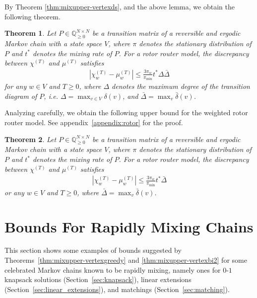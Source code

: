 \documentclass[letter, 11pt]{article}
\newcommand{\1}{\mbox{1}\hspace{-0.25em}\mbox{l}}
\newtheorem{theorem}{Theorem}[section]
\begin{document}
 By Theorem \ref{thm:mixupper-vertexds}, and the above lemma, 
  we obtain the following theorem. 
\begin{theorem}
\label{thm:mixupper-vertexrr}
 Let $P \in \mathbb{Q}_{\geq 0}^{N \times N}$ be a transition matrix of 
  a reversible and ergodic Markov chain with a state space $V$, where $\pi$ denotes the stationary distribution of $P$ and $t^*$ denotes the mixing rate of $P$. 
  For a rotor router model, the discrepancy between $\chi^{(T)}$ and $\mu^{(T)}$ satisfies
\begin{eqnarray*}
\left|\chi_w^{(T)}-\mu_w^{(T)}\right|
\leq \frac{3\pi_w}{\pi_{\min}} t^* \Delta \bar{\Delta}
\end{eqnarray*}
for any $w\in V$ and $T\geq 0$, where $\Delta$ denotes the maximum degree of the transition diagram of $P$, {\rm i.e.} $\Delta=\max_{v\in V}\delta(v)$, and $\bar{\Delta}=\max_v\bar{\delta}(v)$. 
\end{theorem}
Analyzing carefully, we obtain the following upper bound for the weighted rotor router model. See appendix~\ref{appendix:rotor} for the proof.  
\begin{theorem}
\label{thm:mixupper-vertexrr2}
 Let $P \in \mathbb{Q}_{\geq 0}^{N \times N}$ be a transition matrix of 
  a reversible and ergodic Markov chain with a state space $V$, where $\pi$ denotes the stationary distribution of $P$ and $t^*$ denotes the mixing rate of $P$. 
  For a rotor router model, the discrepancy between $\chi^{(T)}$ and $\mu^{(T)}$ satisfies
\begin{eqnarray*}
\left|\chi_w^{(T)}-\mu_w^{(T)}\right|
\leq \frac{3\pi_w}{\pi_{\min}}t^* \bar{\Delta}
\end{eqnarray*}
or any $w\in V$ and $T\geq 0$, where $\bar{\Delta}=\max_v\bar{\delta}(v)$. 
\end{theorem}


\section{Bounds For Rapidly Mixing Chains}\label{sec:applications}
This section shows some examples of 
   bounds suggested by Theorems~\ref{thm:mixupper-vertexgreedy} and \ref{thm:mixupper-vertexbi2} 
  for some celebrated Markov chains known to be rapidly mixing,  
   namely ones for $0$-$1$ knapsack solutions (Section~\ref{sec:knapsack}), 
  linear extensions (Section~\ref{sec:linear_extensions}), and 
  matchings (Section~\ref{sec:matching}). 
\end{document}

